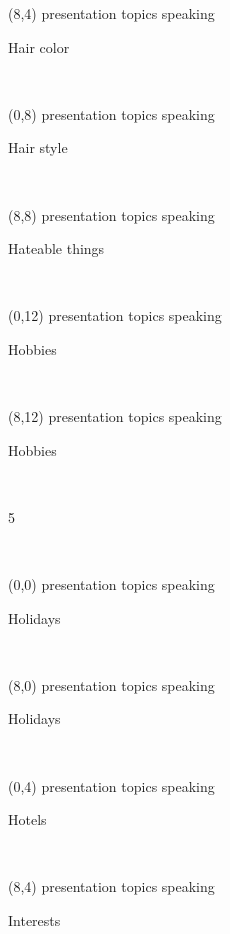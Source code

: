 \documentclass[a4paper]{article}
\newcommand{\mycard}[5]{%
	\small #1 #2
	\par
	\parbox[t][6.7cm][c]{9.5cm}{%
	\hspace{0.1cm} \Large#3\\
	\normalsize#4 #5
	}
}
\begin{document}
\begin{textblock}{8}(8,4)
\mycard{presentation topics}{speaking}{\parbox{9.0cm}{
\centering Hair color    
}}{}{} 
\end{textblock}

\begin{textblock}{8}(0,8)
\mycard{presentation topics}{speaking}{\parbox{9.0cm}{
\centering Hair style 
}}{}{} 
\end{textblock}

\begin{textblock}{8}(8,8)
\mycard{presentation topics}{speaking}{\parbox{9.0cm}{
\centering Hateable things      
}}{}{} 
\end{textblock}

\begin{textblock}{8}(0,12)
\mycard{presentation topics}{speaking}{\parbox{9.0cm}{
\centering Hobbies    
}}{}{} 
\end{textblock}

\begin{textblock}{8}(8,12)
\mycard{presentation topics}{speaking}{\parbox{9.0cm}{
\centering Hobbies      
}}{}{} 
\end{textblock}

\begin{tiny}5\end{tiny}\\
\newpage

\begin{textblock}{8}(0,0)
\mycard{presentation topics}{speaking}{\parbox{9.0cm}{
\centering Holidays   
}}{}{} 
\end{textblock}

\begin{textblock}{8}(8,0)
\mycard{presentation topics}{speaking}{\parbox{9.0cm}{
\centering Holidays     
}}{}{} 
\end{textblock}

\begin{textblock}{8}(0,4)
\mycard{presentation topics}{speaking}{\parbox{9.0cm}{
\centering Hotels     
}}{}{} 
\end{textblock}

\begin{textblock}{8}(8,4)
\mycard{presentation topics}{speaking}{\parbox{9.0cm}{
\centering Interests    
}}{}{} 
\end{textblock}
\end{document}
